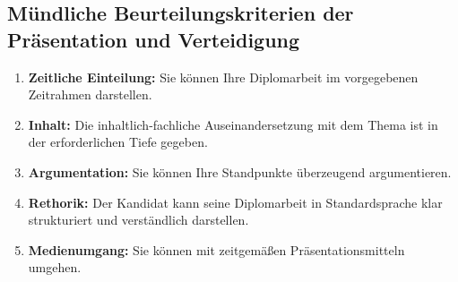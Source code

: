 \documentclass[a4paper, 12pt, xcolor=dvipsnames]{scrartcl}	%
\begin{document}
\subsection{Mündliche Beurteilungskriterien der Präsentation und Verteidigung}		%
\begin{enumerate}																	%
	\item\textbf{Zeitliche Einteilung:} Sie können Ihre Diplomarbeit im vorgegebenen Zeitrahmen darstellen.
	\item\textbf{Inhalt:} Die inhaltlich-fachliche Auseinandersetzung mit dem Thema ist in der erforderlichen Tiefe gegeben.
	\item\textbf{Argumentation:} Sie können Ihre Standpunkte überzeugend argumentieren.
	\item\textbf{Rethorik:} Der Kandidat kann seine Diplomarbeit in Standardsprache klar strukturiert und verständlich darstellen.
	\item\textbf{Medienumgang:} Sie können mit zeitgemäßen Präsentationsmitteln umgehen.
\end{enumerate}

\Blindtext \lipsum[1-2]															%
%
\newpage																			%
%
%
%
\end{document}
